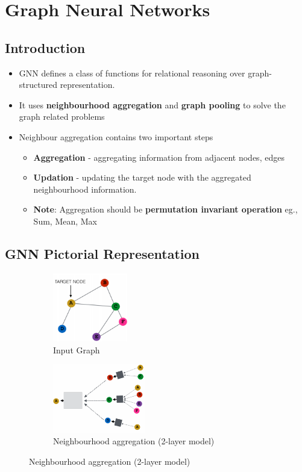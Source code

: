 \chapter{Graph Neural Networks}

\section{Introduction}
    \begin{itemize}
        \item GNN defines a class of functions for relational reasoning over graph-structured representation.
        \item It uses \textbf{neighbourhood aggregation} and \textbf{graph pooling} to solve the graph related problems
        \item Neighbour aggregation contains two important steps
        \begin{itemize}
            \item \textbf{Aggregation} - aggregating information from adjacent nodes, edges
            \item \textbf{Updation} - updating the target node with the aggregated neighbourhood information.
            \item \textbf{Note}: Aggregation should be \textbf{permutation invariant operation} eg., Sum, Mean, Max
        \end{itemize}
    \end{itemize}
    
\section{GNN Pictorial Representation}
    \begin{figure}[h]
    \centering
    \begin{subfigure}[b]{0.3\textwidth}
                \includegraphics[width=\textwidth,height=3cm]{tex/img/Eggraph.png}
                \caption{Input Graph}
        \end{subfigure}%
        \hfill
    \begin{subfigure}[b]{0.5\textwidth}
                \includegraphics[width=\textwidth,height=3cm]{tex/img/GNNmodel.png}
                \caption{Neighbourhood aggregation (2-layer model)}
       \end{subfigure}%
    \end{figure}

